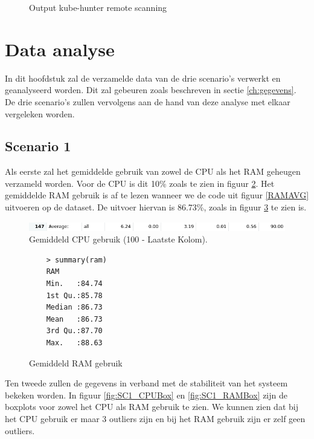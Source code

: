 \begin{figure}[h] 
	\centering
	\inputminted[fontsize=\footnotesize,linenos]{yaml}{files/hunterJob.yaml}
	\caption{Output kube-hunter remote scanning}
	\label{hunterjob}
\end{figure}

\clearpage
\section{Data analyse} 
In dit hoofdstuk zal de verzamelde data van de drie scenario's verwerkt en geanalyseerd worden. Dit zal gebeuren zoals beschreven in sectie \ref{ch:gegevens}. De drie scenario's zullen vervolgens aan de hand van deze analyse met elkaar vergeleken worden.

\clearpage
\subsection{Scenario 1}
Als eerste zal het gemiddelde gebruik van zowel de CPU als het RAM geheugen verzameld worden. Voor de CPU is dit 10\% zoals te zien in figuur \ref{fig:SC1_CPUAVG}. Het gemiddelde RAM gebruik is af te lezen wanneer we de code uit figuur \ref{RAMAVG} uitvoeren op de dataset. De uitvoer hiervan is 86.73\%, zoals in figuur \ref{SC1_RAMAVG} te zien is.
\begin{figure}[h]
	\centering
	\includegraphics[width=\linewidth]{img/SC1_CPUAVG.png}
	\caption{Gemiddeld CPU gebruik (100 - Laatste Kolom).}
	\label{fig:SC1_CPUAVG}
\end{figure}
\begin{figure}[h]
	\centering
	\begin{verbatim} 
	> summary(ram)
	RAM       
	Min.   :84.74  
	1st Qu.:85.78  
	Median :86.73  
	Mean   :86.73  
	3rd Qu.:87.70  
	Max.   :88.63
	\end{verbatim}
	\caption{Gemiddeld RAM gebruik}
	\label{SC1_RAMAVG}
\end{figure}

Ten tweede zullen de gegevens in verband met de stabiliteit van het systeem bekeken worden. In figuur \ref{fig:SC1_CPUBox} en \ref{fig:SC1_RAMBox} zijn de boxplots voor zowel het CPU als RAM gebruik te zien. We kunnen zien dat bij het CPU gebruik er maar 3 outliers zijn en bij het RAM gebruik zijn er zelf geen outliers. 

